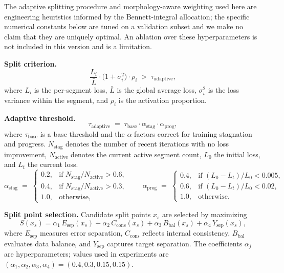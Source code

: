 \documentclass{article}
\theoremstyle{plain}
\theoremstyle{definition}
\theoremstyle{remark}
\begin{document}
The adaptive splitting procedure and morphology-aware weighting used here are
engineering heuristics informed by the Bennett-integral allocation; the
specific numerical constants below are tuned on a validation subset and we
make no claim that they are uniquely optimal. An ablation over these
hyperparameters is not included in this version and is a limitation.

\noindent\textbf{Split criterion.}
\begin{equation}
\frac{L_i}{\bar{L}} \cdot \big(1 + \sigma_i^2\big) \cdot \rho_i
\;>\; \tau_{\mathrm{adaptive}},
\end{equation}
where $L_i$ is the per-segment loss, $\bar{L}$ is the global average loss,
$\sigma_i^2$ is the loss variance within the segment, and $\rho_i$ is the
activation proportion.

\noindent\textbf{Adaptive threshold.}
\begin{equation}
\tau_{\mathrm{adaptive}}
\;=\; \tau_{\mathrm{base}} \cdot \alpha_{\mathrm{stag}} \cdot \alpha_{\mathrm{prog}},
\end{equation}
where $\tau_{\mathrm{base}}$ is a base threshold and the $\alpha$ factors
correct for training stagnation and progress. $N_{\mathrm{stag}}$ denotes the
number of recent iterations with no loss improvement, $N_{\mathrm{active}}$
denotes the current active segment count, $L_0$ the initial loss, and $L_t$
the current loss.
\begin{equation}
\alpha_{\mathrm{stag}} \;=\;
\begin{cases}
0.2, & \text{if } N_{\mathrm{stag}}/N_{\mathrm{active}} > 0.6,\\
0.4, & \text{if } N_{\mathrm{stag}}/N_{\mathrm{active}} > 0.3,\\
1.0, & \text{otherwise,}
\end{cases}
\qquad
\alpha_{\mathrm{prog}} \;=\;
\begin{cases}
0.4, & \text{if } (L_0-L_t)/L_0 < 0.005,\\
0.6, & \text{if } (L_0-L_t)/L_0 < 0.02,\\
1.0, & \text{otherwise.}
\end{cases}
\end{equation}

\noindent\textbf{Split point selection.}
Candidate split points $x_s$ are selected by maximizing
\begin{equation}
S(x_s)
= \alpha_1\,E_{\mathrm{sep}}(x_s)
+ \alpha_2\,C_{\mathrm{cons}}(x_s)
+ \alpha_3\,B_{\mathrm{bal}}(x_s)
+ \alpha_4\,Y_{\mathrm{sep}}(x_s),
\end{equation}
where $E_{\mathrm{sep}}$ measures error separation, $C_{\mathrm{cons}}$
reflects internal consistency, $B_{\mathrm{bal}}$ evaluates data balance, and
$Y_{\mathrm{sep}}$ captures target separation. The coefficients $\alpha_j$
are hyperparameters; values used in experiments are
$(\alpha_1,\alpha_2,\alpha_3,\alpha_4) = (0.4, 0.3, 0.15, 0.15)$.
\end{document}
